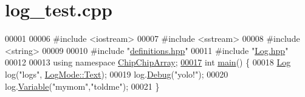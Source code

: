 \hypertarget{log__test_8cpp_source}{\section{log\+\_\+test.\+cpp}
\label{log__test_8cpp_source}
}

\begin{DoxyCode}
00001 
00006 \textcolor{preprocessor}{#include <iostream>}
00007 \textcolor{preprocessor}{#include <sstream>}
00008 \textcolor{preprocessor}{#include <string>}
00009 
00010 \textcolor{preprocessor}{#include "\hyperlink{definitions_8hpp}{definitions.hpp}"}
00011 \textcolor{preprocessor}{#include "\hyperlink{Log_8hpp}{Log.hpp}"}
00012 
00013 \textcolor{keyword}{using namespace }\hyperlink{namespaceChipChipArray}{ChipChipArray};
\hypertarget{log__test_8cpp_source_l00017}{}\hyperlink{log__test_8cpp_ae66f6b31b5ad750f1fe042a706a4e3d4}{00017} \textcolor{keywordtype}{int} \hyperlink{namespaceChipChipArray_a7fc3d1edffca11531cd09fdab7c8b88d}{main}() \{
00018     \hyperlink{classChipChipArray_1_1Log}{Log} log(\textcolor{stringliteral}{"logs"}, \hyperlink{definitions_8hpp_aa7380b6d694cab49f07aed6a7af592d9a9dffbf69ffba8bc38bc4e01abf4b1675}{LogMode::Text});
00019     log.\hyperlink{classChipChipArray_1_1Log_ac32b435af1577e4ebc67af2bdfea8eff}{Debug}(\textcolor{stringliteral}{"yolo!"});
00020     log.\hyperlink{classChipChipArray_1_1Log_a8849569720c26e335e7ef4dcb912170b}{Variable}(\textcolor{stringliteral}{"mymom"},\textcolor{stringliteral}{"toldme"});
00021 \}
\end{DoxyCode}
